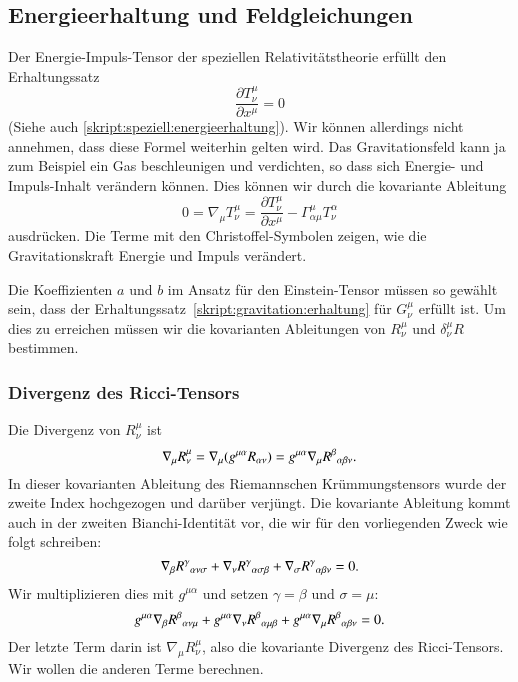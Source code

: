 \subsection{Energieerhaltung und Feldgleichungen}
Der Energie-Impuls-Tensor der speziellen Relativitätstheorie
erfüllt den Erhaltungssatz
\[
\frac{\partial T^\mu_\nu}{\partial x^\mu}
=0
\]
(Siehe auch \eqref{skript:speziell:energieerhaltung}).
Wir können allerdings nicht annehmen, dass diese Formel weiterhin
gelten wird.
Das Gravitationsfeld kann ja zum Beispiel ein Gas beschleunigen und 
verdichten, so dass sich Energie- und Impuls-Inhalt verändern können.
Dies können wir durch die kovariante Ableitung
\begin{equation}
0
=
\nabla_\mu T^\mu_\nu
=
\frac{\partial T^\mu_\nu}{\partial x^\mu}
-
\Gamma^{\mu}_{\alpha\mu}T^\alpha_\nu
\label{skript:gravitation:erhaltung}
\end{equation}
ausdrücken.
Die Terme mit den Christoffel-Symbolen zeigen, wie die Gravitationskraft
Energie und Impuls verändert.

Die Koeffizienten $a$ und $b$ im Ansatz
\label{skript:gravitation:einsteinansatz}
für den Einstein-Tensor müssen so gewählt sein, dass der 
Erhaltungssatz~\eqref{skript:gravitation:erhaltung} für $G^\mu_\nu$
erfüllt ist.
Um dies zu erreichen müssen wir die kovarianten Ableitungen von $R^\mu_\nu$
und $\delta^\mu_\nu R$ bestimmen.

\subsubsection{Divergenz des Ricci-Tensors}
Die Divergenz von $R^\mu_\nu$ ist
\[
\nabla_\mu R^\mu_\nu
=
\nabla_\mu (g^{\mu\alpha}R_{\alpha\nu})
=
g^{\mu\alpha} \nabla_\mu R^\beta\mathstrut_{\alpha\beta\nu}.
\]
In dieser kovarianten Ableitung des Riemannschen Krümmungstensors
wurde der zweite Index hochgezogen und darüber verjüngt.
Die kovariante Ableitung kommt auch in der zweiten Bianchi-Identität
vor, die wir für den vorliegenden Zweck wie folgt schreiben:
\[
\nabla_\beta R^\gamma\mathstrut_{\alpha\nu\sigma}
+
\nabla_\nu R^\gamma\mathstrut_{\alpha\sigma\beta}
+
\nabla_\sigma R^\gamma\mathstrut_{\alpha\beta\nu}
=
0.
\]
Wir multiplizieren dies mit $g^{\mu\alpha}$ und setzen $\gamma=\beta$
und $\sigma=\mu$:
\[
g^{\mu\alpha}
\nabla_\beta R^\beta\mathstrut_{\alpha\nu\mu}
+
g^{\mu\alpha}
\nabla_\nu R^\beta\mathstrut_{\alpha\mu\beta}
+
g^{\mu\alpha}
\nabla_\mu R^\beta\mathstrut_{\alpha\beta\nu}
=
0.
\]
Der letzte Term darin ist $\nabla_\mu R^\mu_\nu$, also die
kovariante Divergenz des Ricci-Tensors.
Wir wollen die anderen Terme berechnen.

